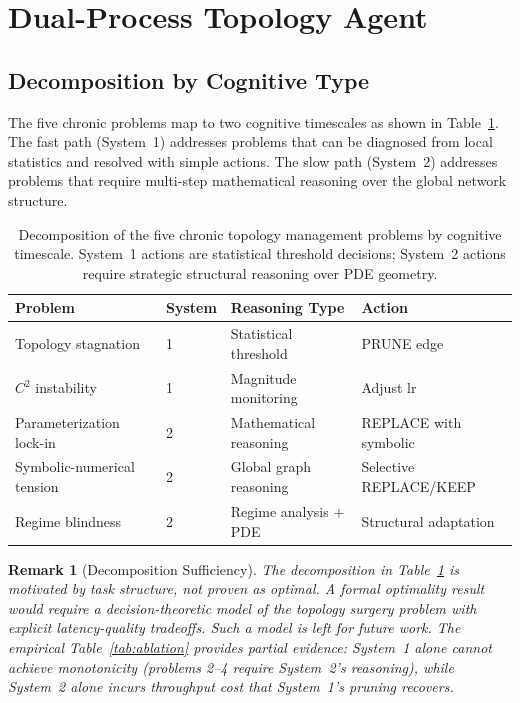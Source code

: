 \documentclass[11pt,a4paper]{article}
\newtheorem{remark}{Remark}
\begin{document}
\section{Dual-Process Topology Agent}
\label{sec:agent}

\subsection{Decomposition by Cognitive Type}
\label{sec:agent:decomposition}

The five chronic problems map to two cognitive timescales as shown in
Table~\ref{tab:decomposition}. The fast path (System~1) addresses problems that can
be diagnosed from local statistics and resolved with simple actions. The slow path
(System~2) addresses problems that require multi-step mathematical reasoning over the
global network structure.

\begin{table}[ht]
\centering
\caption{Decomposition of the five chronic topology management problems by cognitive
timescale. System~1 actions are statistical threshold decisions; System~2 actions
require strategic structural reasoning over PDE geometry.}
\begin{tabular}{@{}llll@{}}
\toprule
Problem & System & Reasoning Type & Action \\
\midrule
Topology stagnation & 1 & Statistical threshold & PRUNE edge \\
$C^2$ instability & 1 & Magnitude monitoring & Adjust lr \\
Parameterization lock-in & 2 & Mathematical reasoning & REPLACE with symbolic \\
Symbolic-numerical tension & 2 & Global graph reasoning & Selective REPLACE/KEEP \\
Regime blindness & 2 & Regime analysis $+$ PDE & Structural adaptation \\
\bottomrule
\end{tabular}
\label{tab:decomposition}
\end{table}

\begin{remark}[Decomposition Sufficiency]
The decomposition in Table~\ref{tab:decomposition} is motivated by task structure, not proven
as optimal. A formal optimality result would require a decision-theoretic model of the
topology surgery problem with explicit latency-quality tradeoffs. Such a model is left
for future work. The empirical Table~\ref{tab:ablation} provides partial evidence: System~1
alone cannot achieve monotonicity (problems 2--4 require System~2's reasoning), while
System~2 alone incurs throughput cost that System~1's pruning recovers.
\end{remark}
\end{document}

